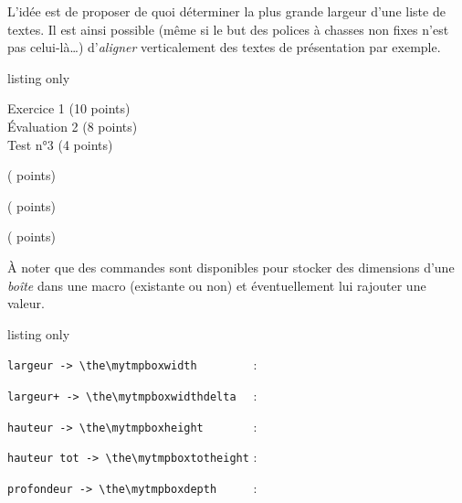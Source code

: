 \documentclass[french,11pt,a4paper]{article}
\begin{document}
L'idée est de proposer de quoi déterminer la plus grande largeur d'une liste de textes. Il est ainsi possible (même si le but des polices à chasses non fixes n'est pas celui-là\ldots) d'\textit{aligner} verticalement des textes de présentation par exemple.

\begin{DemoCode}{listing only}

\end{DemoCode}

\begin{DemoCode}{}
\the\tmpwideststring
\end{DemoCode}

\begin{DemoCode}{}
\sffamily\Large
Exercice 1 (10 points)\\
Évaluation 2 (8 points) \\
Test n°3 (4 points)
\end{DemoCode}

\begin{DemoCode}{}
\sffamily\Large
{} 
( points)

( points)

( points)
\end{DemoCode}

À noter que des commandes sont disponibles pour stocker des dimensions d'une \textit{boîte} dans une macro (existante ou non) et éventuellement lui rajouter une valeur.

\begin{DemoCode}{listing only}
\end{DemoCode}

\begin{DemoCode}{}
\def\tmpbox{\large $1+\frac{1}{x}$}
%
\storewidthtolength{\tmpbox}{\mytmpboxwidth}
\verb|largeur -> \the\mytmpboxwidth        | : \the\mytmpboxwidth

\storewidthtolength[10pt]{\tmpbox}{\mytmpboxwidthdelta}
\verb|largeur+ -> \the\mytmpboxwidthdelta  | : \the\mytmpboxwidthdelta

\storeheighttolength{\tmpbox}{\mytmpboxheight}
\verb|hauteur -> \the\mytmpboxheight       | : \the\mytmpboxheight

\storetotalheighttolength{\tmpbox}{\mytmpboxtotheight}
\verb|hauteur tot -> \the\mytmpboxtotheight| : \the\mytmpboxtotheight

\storedepthtolength{\tmpbox}{\mytmpboxdepth}
\verb|profondeur -> \the\mytmpboxdepth     | : \the\mytmpboxdepth
\end{DemoCode}
\end{document}
